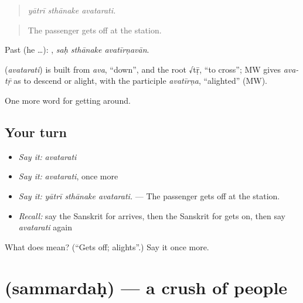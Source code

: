 \begin{quote}
  
\end{quote}

\begin{quote}
\emph{yātrī sthānake avatarati.}
\end{quote}

\begin{quote}
The passenger gets off at the station.
\end{quote}

Past (he …):   , \emph{saḥ sthānake avatīrṇavān}.

\begin{cousinweb}
\textbf{} (\emph{avatarati}) is built from \emph{ava}, \textquotedblleft{}down\textquotedblright{}, and the root √tṝ, \textquotedblleft{}to cross\textquotedblright{}; MW gives \emph{ava-tṝ} as to descend or alight, with the participle \emph{avatīrṇa}, \textquotedblleft{}alighted\textquotedblright{} (MW).
\end{cousinweb}

\begin{grammarlens}[title={What you've built}]
One more word for getting around.
\end{grammarlens}

\subsection*{Your turn}
\begin{itemize}
\raggedright
  \item \emph{Say it:} \emph{avatarati}
  \item \emph{Say it:} \emph{avatarati}, once more
  \item \emph{Say it:} \emph{yātrī sthānake avatarati.} — The passenger gets off at the station.
  \item \emph{Recall:} say the Sanskrit for arrives, then the Sanskrit for gets on, then say \emph{avatarati} again
\end{itemize}

\begin{tcolorbox}[breakable,colback=teal!4,colframe=teal!35!black,title={Before you move on}]
What does  mean? (\textquotedblleft{}Gets off; alights\textquotedblright{}.) Say it once more.
\end{tcolorbox}
\section[\texorpdfstring{\sk{सम्मर्दः} (sammardaḥ)}{सम्मर्दः (sammardaḥ)}]{ (sammardaḥ) — a crush of people}


